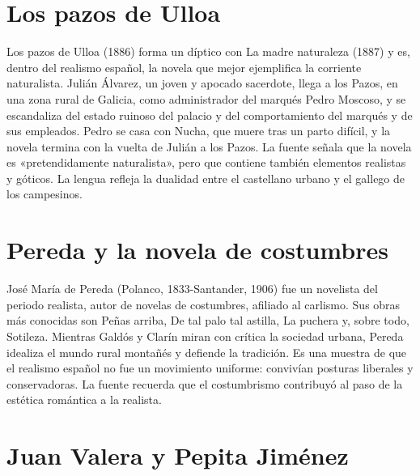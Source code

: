 \documentclass{book}
\begin{document}

\section{Los pazos de Ulloa}

Los pazos de Ulloa (1886) forma un díptico con La madre naturaleza (1887) y es, dentro del realismo español, la novela que mejor ejemplifica la corriente naturalista. Julián Álvarez, un joven y apocado sacerdote, llega a los Pazos, en una zona rural de Galicia, como administrador del marqués Pedro Moscoso, y se escandaliza del estado ruinoso del palacio y del comportamiento del marqués y de sus empleados. Pedro se casa con Nucha, que muere tras un parto difícil, y la novela termina con la vuelta de Julián a los Pazos. La fuente señala que la novela es «pretendidamente naturalista», pero que contiene también elementos realistas y góticos. La lengua refleja la dualidad entre el castellano urbano y el gallego de los campesinos.


\section{Pereda y la novela de costumbres}

José María de Pereda (Polanco, 1833-Santander, 1906) fue un novelista del periodo realista, autor de novelas de costumbres, afiliado al carlismo. Sus obras más conocidas son Peñas arriba, De tal palo tal astilla, La puchera y, sobre todo, Sotileza. Mientras Galdós y Clarín miran con crítica la sociedad urbana, Pereda idealiza el mundo rural montañés y defiende la tradición. Es una muestra de que el realismo español no fue un movimiento uniforme: convivían posturas liberales y conservadoras. La fuente recuerda que el costumbrismo contribuyó al paso de la estética romántica a la realista.


\section{Juan Valera y Pepita Jiménez}
\end{document}
